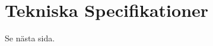 \documentclass[conference,a4paper]{IEEEtran}
\begin{document}
\section{Tekniska Specifikationer}
Se nästa sida.
\newpage
\null%
\newpage





\end{document}
